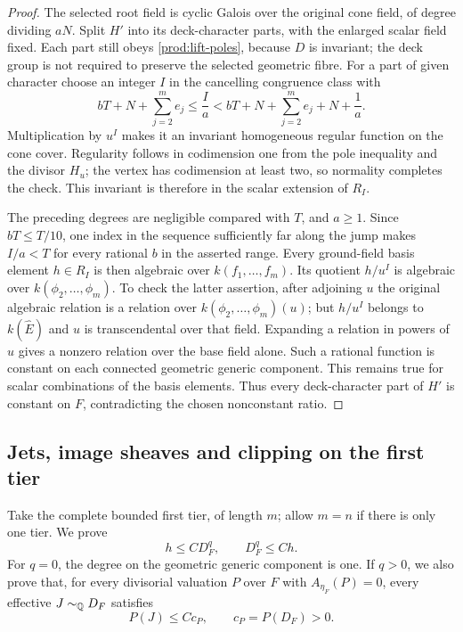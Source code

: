 \begin{proof}
The selected root field is cyclic Galois over the original cone field,
of degree dividing $aN$.  Split $H'$ into its deck-character parts,
with the enlarged scalar field fixed.  Each part still obeys
\eqref{prod:lift-poles}, because $D$ is invariant; the deck group is
not required to preserve the selected geometric fibre.  For a part of
given character choose an integer $I$ in the cancelling congruence
class with
\[
 bT+N+\sum_{j=2}^m e_j
 \leq \frac Ia
 <bT+N+\sum_{j=2}^m e_j+N+\frac1a.
\]
Multiplication by $u^I$ makes it an invariant homogeneous regular
function on the cone cover.  Regularity follows in codimension one
from the pole inequality and the divisor $H_u$; the vertex has
codimension at least two, so normality completes the check.  This
invariant is therefore in the scalar extension of $R_I$.

The preceding degrees are negligible compared with $T$, and $a\geq1$.
Since $bT\leq T/10$, one index in the sequence sufficiently far along
the jump makes $I/a<T$ for every rational $b$ in the asserted range.
Every ground-field basis element $h\in R_I$ is then algebraic over
$k(f_1,\ldots,f_m)$.  Its quotient $h/u^I$ is algebraic over
$k(\phi_2,\ldots,\phi_m)$.  To check the latter assertion, after
adjoining $u$ the original algebraic relation is a relation over
$k(\phi_2,\ldots,\phi_m)(u)$; but $h/u^I$ belongs to
$k(\widehat E)$ and $u$ is transcendental over that field.  Expanding
a relation in powers of $u$ gives a nonzero relation over the base
field alone.  Such a rational function is constant on each connected
geometric generic component.  This remains true for scalar combinations
of the basis elements.  Thus every deck-character part of $H'$ is
constant on $F$, contradicting the chosen nonconstant ratio.
\end{proof}

\subsection{Jets, image sheaves and clipping on the first tier}

Take the complete bounded first tier, of length $m$; allow $m=n$ if
there is only one tier.  We prove
\begin{equation}\label{prod:initial-volume}
 h\leq C D_F^q,\qquad D_F^q\leq Ch.
\end{equation}
For $q=0$, the degree on the geometric generic component is one.
If $q>0$, we also prove that, for every divisorial valuation $P$ over
$F$ with $A_{\eta_F}(P)=0$, every effective $J\sim_{\mathbb Q}D_F$ satisfies
\begin{equation}\label{prod:clipping}
 P(J)\leq Cc_P,\qquad c_P=P(D_F)>0.
\end{equation}

